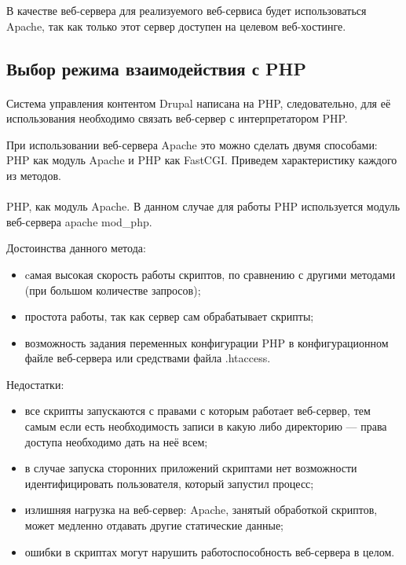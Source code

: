 В качестве веб-сервера для реализуемого веб-сервиса
будет использоваться Apache, так как только этот сервер доступен
на целевом веб-хостинге.

\subsection{Выбор режима взаимодействия с PHP}
\label{ssec:choice_php_communication}

\paragraph{}
Система управления контентом Drupal написана на PHP, следовательно, для её использования необходимо связать
веб-сервер с интерпретатором PHP.

При использовании веб-сервера Apache это можно сделать двумя способами: PHP как модуль Apache и PHP как FastCGI.
Приведем характеристику каждого из методов.

\paragraph{}
PHP, как модуль Apache. В данном случае для работы PHP используется модуль веб-сервера apache mod\_php.

Достоинства данного метода:
\begin{itemize}
\item
  cамая высокая скорость работы скриптов, по сравнению с другими методами
  (при большом количестве запросов);
\item
  простота работы, так как сервер сам обрабатывает скрипты;
\item
  возможность задания переменных конфигурации PHP в конфигурационном файле веб-сервера или средствами файла .htaccess.
\end{itemize}

Недостатки:
\begin{itemize}
\item все скрипты запускаются с правами с которым работает веб-сервер, 
  тем самым если есть необходимость записи в какую либо директорию ---
  права доступа необходимо дать на неё всем;
\item
  в случае запуска сторонних приложений скриптами нет возможности
  идентифицировать пользователя, который запустил процесс;
\item
  излишняя нагрузка на веб-сервер: Apache, занятый обработкой скриптов,
  может медленно отдавать другие статические данные;
\item
  ошибки в скриптах могут нарушить работоспособность веб-сервера в целом.
\end{itemize}

